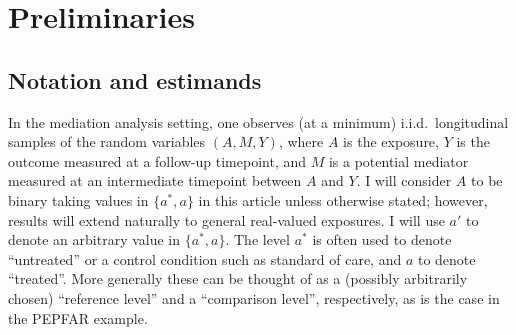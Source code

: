 \documentclass[12pt]{article}
\begin{document}

\section{Preliminaries}
\label{sec:prelims}

\subsection{Notation and estimands}
\label{subsec:estimands}
In the mediation analysis setting, one observes (at a minimum) i.i.d.~longitudinal samples of the random variables $(A,M,Y)$, where $A$ is the exposure, $Y$ is the outcome measured at a follow-up timepoint, and $M$ is a potential mediator measured at an intermediate timepoint between $A$ and $Y$. I will consider $A$ to be binary taking values in $\{a^*,a\}$ in this article unless otherwise stated; however, results will extend naturally to general real-valued exposures. I will use $a'$ to denote an arbitrary value in $\{a^*,a\}$. The level $a^*$ is often used to denote ``untreated'' or a control condition such as standard of care, and $a$ to denote ``treated''. More generally these can be thought of as a (possibly arbitrarily chosen) ``reference level'' and a ``comparison level'', respectively, as is the case in the PEPFAR example. 
\end{document}
